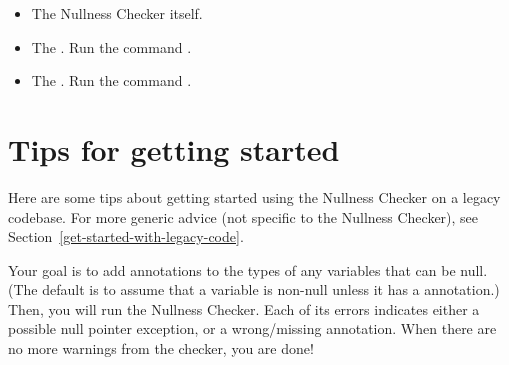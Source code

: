 \begin{itemize}
\item
The Nullness Checker itself.

\item
The
.
Run the command .


\item
The
.
Run the command .

%
%
%

\end{itemize}


\section{Tips for getting started\label{nullness-getting-started}}

Here are some tips about getting started using the Nullness Checker on a
legacy codebase.  For more generic advice (not specific to the Nullness
Checker), see Section~\ref{get-started-with-legacy-code}.

Your goal is to add  annotations
to the types of any variables that can be null.  (The default is to assume
that a variable is non-null unless it has a  annotation.)
Then, you will run the Nullness Checker.  Each of its errors indicates
either a possible null pointer exception, or a wrong/missing annotation.
When there are no more warnings from the checker, you are done!

